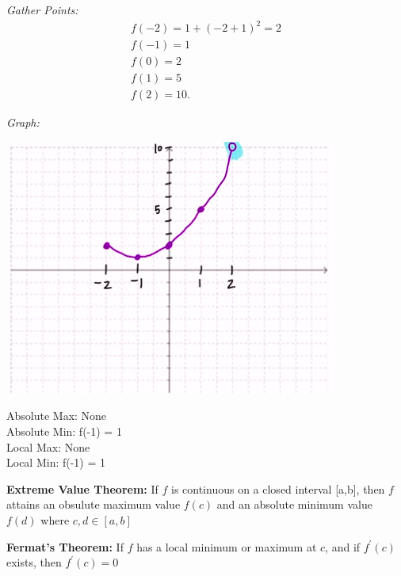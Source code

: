 \documentclass{report}
\begin{document}
    \pagebreak \bigbreak \noindent
    \textit{Gather Points:}
    \begin{align*}
      f(-2) = 1+ (-2 + 1)^{2} = 2 \\
      f(-1) = 1 \\
      f(0) = 2 \\
      f(1) = 5 \\
      f(2) = 10
    .\end{align*}

    \bigbreak \noindent 
    \textit{Graph:}
    \begin{center}
      \includegraphics[scale=0.8]{ ./images/2.png}
    \end{center}

    \bigbreak \noindent 

    \bigbreak \noindent 
    \begin{center}
      Absolute Max: None \\
      Absolute Min: f(-1) = 1\\
      Local Max: None \\
      Local Min: f(-1) = 1
    \end{center}

    \bigbreak \noindent 
    \begin{mdframed}
      \textbf{Extreme Value Theorem:}
      If $f$ is continuous on a closed interval [a,b], then $f$ attains an
      obsulute maximum value $f(c)$ and an absolute minimum value $f(d)$ where $c,d \in [a,b]$
    \end{mdframed}

    \smallbreak \noindent
    \begin{mdframed}
      \textbf{Fermat's Theorem:}
      If $f$ has a local minimum or maximum at $c$, and if $f^{\prime}(c)$ exists, 
      then $f^{\prime}(c)=0$
    \end{mdframed}
\end{document}
